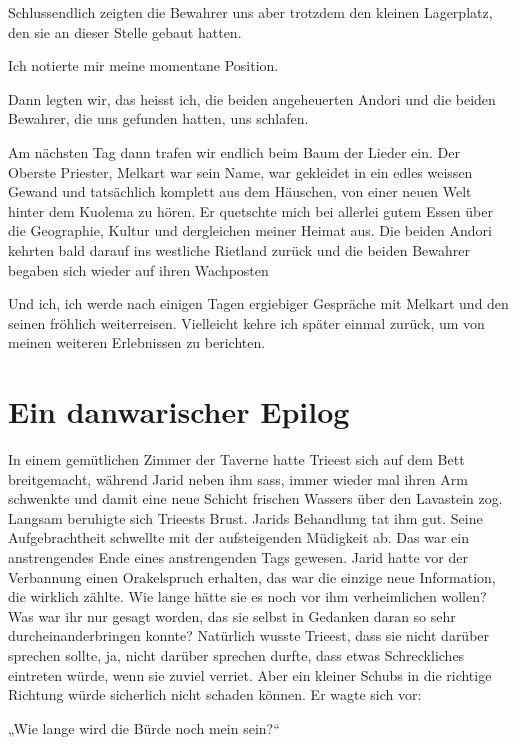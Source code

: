 \documentclass[10pt, a4paper, oneside]{book}
\begin{document}
Schlussendlich zeigten die Bewahrer uns aber trotzdem den kleinen Lagerplatz, den sie an dieser Stelle gebaut hatten.

Ich notierte mir meine momentane Position.\bigskip



Dann legten wir, das heisst ich, die beiden angeheuerten Andori und die beiden Bewahrer, die uns gefunden hatten, uns schlafen.

Am nächsten Tag dann trafen wir endlich beim Baum der Lieder ein. Der Oberste Priester, Melkart war sein Name, war gekleidet in ein edles weissen Gewand und tatsächlich komplett aus dem Häuschen, von einer neuen Welt hinter dem Kuolema zu hören. Er quetschte mich bei allerlei gutem Essen über die Geographie, Kultur und dergleichen meiner Heimat aus. Die beiden Andori kehrten bald darauf ins westliche Rietland zurück und die beiden Bewahrer begaben sich wieder auf ihren Wachposten

Und ich, ich werde nach einigen Tagen ergiebiger Gespräche mit Melkart und den seinen fröhlich weiterreisen. Vielleicht kehre ich später einmal zurück, um von meinen weiteren Erlebnissen zu berichten.




\newpage
\section{Ein danwarischer Epilog}

In einem gemütlichen Zimmer der Taverne hatte Trieest sich auf dem Bett breitgemacht, während Jarid neben ihm sass, immer wieder mal ihren Arm schwenkte und damit eine neue Schicht frischen Wassers über den Lavastein zog. Langsam beruhigte sich Trieests Brust. Jarids Behandlung tat ihm gut. Seine Aufgebrachtheit schwellte mit der aufsteigenden Müdigkeit ab. Das war ein anstrengendes Ende eines anstrengenden Tags gewesen. Jarid hatte vor der Verbannung einen Orakelspruch erhalten, das war die einzige neue Information, die wirklich zählte. Wie lange hätte sie es noch vor ihm verheimlichen wollen? Was war ihr nur gesagt worden, das sie selbst in Gedanken daran so sehr durcheinanderbringen konnte? Natürlich wusste Trieest, dass sie nicht darüber sprechen sollte, ja, nicht darüber sprechen durfte, dass etwas Schreckliches eintreten würde, wenn sie zuviel verriet. Aber ein kleiner Schubs in die richtige Richtung würde sicherlich nicht schaden können. Er wagte sich vor:

„Wie lange wird die Bürde noch mein sein?“
\end{document}
